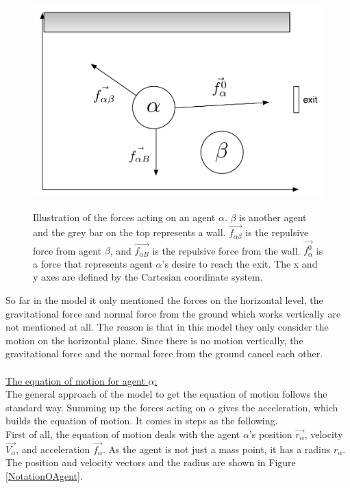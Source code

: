 \begin{figure}[hb]
    \centering
    {\includegraphics[scale=0.45]{Figures/ForceModel.pdf}} 
    \caption{Illustration of the forces acting on an agent $ \alpha $. $ \beta $ is another agent and the grey bar on the top represents a wall. $ \vec{f_{\alpha\beta}} $ is the repulsive force from agent $ \beta $, and $ \vec{f_{\alpha B}} $ is the repulsive force from the wall. $ \vec{f^{0}_{\alpha}} $ is a force that represents agent $ \alpha $'s desire to reach the exit.
    The x and y axes are defined by the Cartesian coordinate system.}
    \label{ForceModel}
\end{figure}

So far in the model it only mentioned the forces on the horizontal level, the gravitational force and normal force from the ground which works vertically are not mentioned at all.  The reason is that in this model they only consider the motion on the horizontal plane.  Since there is no motion vertically, the gravitational force and the normal force from the ground cancel each other.\\\\
\underline{The equation of motion for agent $ \alpha $:}\\

The general approach of the model to get the equation of motion follows the standard way. Summing up the forces acting on $ \alpha $ gives the acceleration, which builds the equation of motion. It comes in steps as the following.\\
First of all, the equation of motion deals with the agent $ \alpha $'s position $ \vec{r_{\alpha}} $, velocity $ \vec{V_{\alpha}} $, and acceleration $ \vec{f_{\alpha}} $. As the agent is not just a mass point, it has a radius $ r_{\alpha} $. The position and velocity vectors and the radius are shown in Figure \ref{NotationOAgent}.

